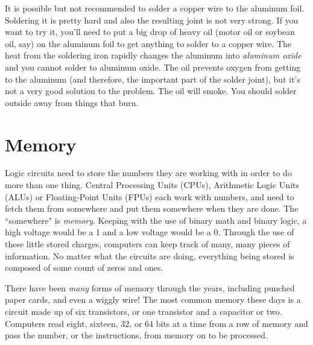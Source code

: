 It is possible but not recommended to solder a copper wire to the aluminum foil. Soldering it is pretty hard and also the resulting joint is not very strong. If you want to try it, you'll need to put a big drop of heavy oil (motor oil or soybean oil, say) on the aluminum foil to get anything to solder to a copper wire. The heat from the soldering iron rapidly changes the aluminum into \emph{aluminum oxide} and you cannot solder to aluminum oxide. The oil prevents oxygen from getting to the aluminum (and therefore, the important part of the solder joint), but it's not a very good solution to the problem. The oil will smoke. You should solder outside away from things that burn.

\newpage


\newpage
\section*{Memory}

Logic circuits need to store the numbers they are working with in order to do more than one thing. Central Processing Units (CPUs), Arithmetic Logic Units (ALUs) or Floating-Point Units (FPUs) each work with numbers, and need to fetch them from somewhere and put them somewhere when they are done. The ``somewhere" is \emph{memory}. Keeping with the use of binary math and binary logic, a high voltage would be a 1 and a low voltage would be a 0. Through the use of these little stored charges, computers can keep track of many, many pieces of information. No matter what the circuits are doing, everything being stored is composed of some count of zeros and ones. 

There have been \emph{many} forms of memory through the years, including punched paper cards, and even a wiggly wire! The most common memory these days is a circuit made up of six transistors, or one transistor and a capacitor or two. Computers read eight, sixteen, 32, or 64 bits at a time from a row of memory and pass the number, or the instructions, from memory on to be processed.


